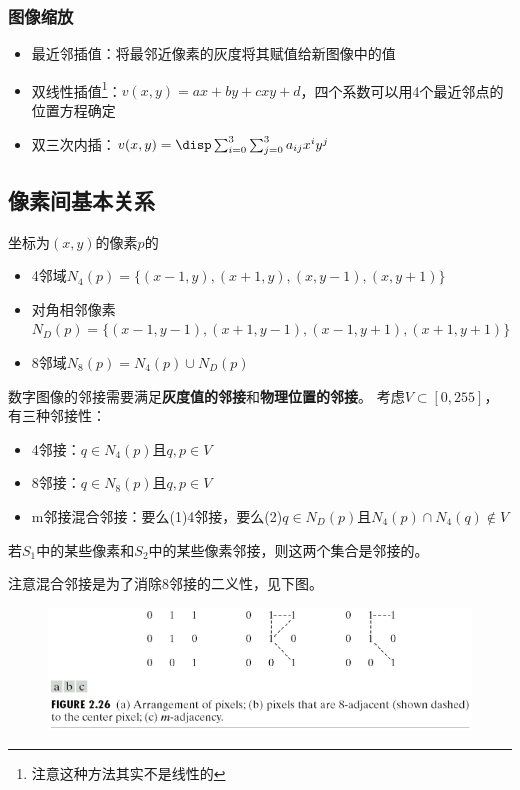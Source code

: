 \subsubsection{图像缩放}
\begin{itemize}
	\item 最近邻插值：将最邻近像素的灰度将其赋值给新图像中的值
	\item 双线性插值\footnote{注意这种方法其实不是线性的}：$v(x,y)=ax+by+cxy+d$，四个系数可以用4个最近邻点的位置方程确定
	\item 双三次内插：$v(x,y)=\disp\sum_{i=0}^3\sum_{j=0}^3a_{ij}x^iy^j$
\end{itemize}

\subsection{像素间基本关系}
\begin{definition}[邻域]
坐标为$(x,y)$的像素$p$的
\begin{itemize}
\item 4邻域$N_4(p)=\{(x-1,y),(x+1,y),(x,y-1),(x,y+1)\}$
\item 对角相邻像素$N_D(p)=\{(x-1,y-1),(x+1,y-1),(x-1,y+1),(x+1,y+1)\}$
\item 8邻域$N_8(p)=N_4(p)\cup N_D(p)$
\end{itemize}
\end{definition}

\begin{definition}[邻接性]
数字图像的邻接需要满足\textbf{灰度值的邻接}和\textbf{物理位置的邻接}。
考虑$V\subset[0,255]$，有三种邻接性：
\begin{itemize}
	\item 4邻接：$q\in N_4(p)$且$q,p\in V$
	\item 8邻接：$q\in N_8(p)$且$q,p\in V$
	\item m邻接混合邻接：要么(1)4邻接，要么(2)$q\in N_D(p)$且$N_4(p)\cap N_4(q)\notin V$
\end{itemize}
若$S_1$中的某些像素和$S_2$中的某些像素邻接，则这两个集合是邻接的。
\end{definition}

注意混合邻接是为了消除8邻接的二义性，见下图。
\begin{figure}[H]
\centering
\includegraphics[width=0.6\linewidth]{fig/adjacency.png}
\end{figure}

